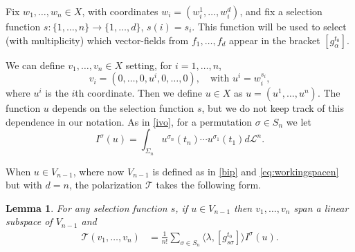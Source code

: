 \documentclass[12pt, reqno]{amsart}
\theoremstyle{plain}
\newtheorem {lemma}[theorem]{Lemma}
\theoremstyle{definition}
\theoremstyle{remark}
\numberwithin{equation}{section}
\renewcommand{\L}{\mathcal{L}}
\newcommand{\T}{\mathcal{T}}
\newcommand{\s}{\sigma}
\newcommand{\0}{\theta}
\renewcommand{\a}{\alpha}
\newcommand{\1}{{-1}}
\renewcommand{\=}{\coloneqq}
\renewcommand{\.}{\dots}
\begin{document}
\renewcommand{\j}{s}

Fix $w_1,\dots,w_n \in X$, with coordinates $w_i=(w_i^1,\.,w_i^d)$,
and fix a selection function  $\j:\{1,\.,n\}\to\{1,\.,d\}$, $\j(i)= s_i$.
This  function will be used to select (with multiplicity) which  vector-fields from $f_1,\dots,f_d$ appear in the bracket $[g_\a^{t_0}]$.


We can define $v_1,\dots,v_n\in X$ setting, for $ i=1,\dots,n$,
 \begin{equation}\label{vi}
  v_i=(0,\.,0,u^i ,0,\.,0),\quad  \textrm{with } u^i = w_i^{\j_i},
 \end{equation}
where $u^i $ is the $i$th coordinate. Then we define    $u\in X$ as $u = (u^1,\dots, u^n)$.
The function $u$ depends on the selection function $\j$, but we do not keep track of this dependence in our notation.
As in \eqref{ivo},  for a permutation $\s\in S_n$ we let  
\[
  I^\sigma(u) = \int_{\Sigma_n } u^ {\s_n}  (t_n)\cdots 
 u^ {\s_1} (t_1)d\L^n.
\] 



When $u\in V_{n-1}$, where now $V_{n-1}$ is defined as in \eqref{bip}
and \eqref{eq:workingspacen} but with $d=n$, the polarization $\T$ takes the following form.



\begin{lemma} 
 \label{lemma54} For any selection function $\j$,  if   $u \in V_{n-1}$       then $v_1,\dots, v_n$ span a linear subspace of $V_{n-1}$ and
  \begin{equation}\label{pollo}
\begin{split}
 \T (v_1,\.,v_n) 
 &=\frac{1}{n!}\sum_{\s\in S_n} \langle \lambda, [g^{t_0}_{\j\s } ]\rangle  I^\sigma(u).
 \end{split}
\end{equation}
\end{lemma}
\end{document}

